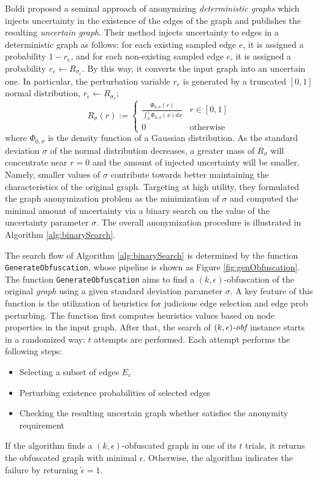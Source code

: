 Boldi {\etal}  proposed a seminal approach of anonymizing \emph{deterministic graphs} which injects uncertainty in the existence of the edges of the graph and publishes the resulting \emph{uncertain graph}. Their method injects uncertainty to edges in a deterministic graph as follows: for each existing sampled edge $e$, it is assigned a probability $1-r_{e}$, and for each non-existing sampled edge $e$, it is assigned a probability $r_{e} \leftarrow R_{\sigma_{e}}$.  By this way, it converts the input graph into an uncertain one. In particular, the perturbation variable $r_{e}$ is generated by a truncated $[0,1]$ normal distribution, $r_{e} \leftarrow R_{\sigma_{e}}$; 
\begin{equation*}
    R_{\sigma}(r):= \begin{cases}
                    \frac{\Phi_{0,\sigma}(r)}{\int_{0}^{1} \Phi_{0,\sigma}(x) dx} &  r \in [0,1] \\
                    0 &  \text{otherwise}
                    \end{cases}
     \label{eq:gen}
\end{equation*} 
where $\Phi_{0,\sigma}$ is the density function of a Gaussian distribution. 
As the standard deviation $\sigma$ of the normal distribution decreases, a greater mass of $R_{\sigma}$ will concentrate near $r=0$ and the amount of injected uncertainty will be smaller.  Namely, smaller values of $\sigma$ contribute towards better maintaining the characteristics of the original graph. Targeting at high utility, they formulated the graph anonymization problem as the minimization of $\sigma$ and computed the minimal amount of uncertainty via a binary search on the value of the uncertainty parameter $\sigma$. The overall anonymization procedure is illustrated in Algorithm \ref{alg:binarySearch}. 

The search flow of Algorithm \ref{alg:binarySearch} is determined by the function \texttt{GenerateObfuscation}, whose pipeline is shown as Figure \ref{fig:genObfuscation}. The function \texttt{GenerateObfuscation} aims to find a $(k,\epsilon)$-obfuscation of the original \emph{graph} using a given standard deviation parameter $\sigma$. A key feature of this function is the utilization of heuristics for judicious edge selection and edge prob perturbing. The function first computes heuristics values based on node properties in the input graph. After that, the search of $\textit{$(k,\epsilon)$-obf}$ instance starts in a randomized way: $t$ attempts are performed. Each attempt performs the following steps:
\begin{itemize}
    \setlength\itemsep{0em}
	\item{Selecting a subset of edges $E_{c}$}
    \item{Perturbing existence probabilities of selected edges}
    \item{Checking the resulting uncertain graph whether satisfies the anonymity requirement}
\end{itemize}
If the algorithm finds a $(k,\epsilon)$-obfuscated graph in one of its $t$ trials, it returns the obfuscated graph with minimal $\epsilon$. Otherwise, the algorithm indicates the failure by returning $\tilde{\epsilon}=1$. 


